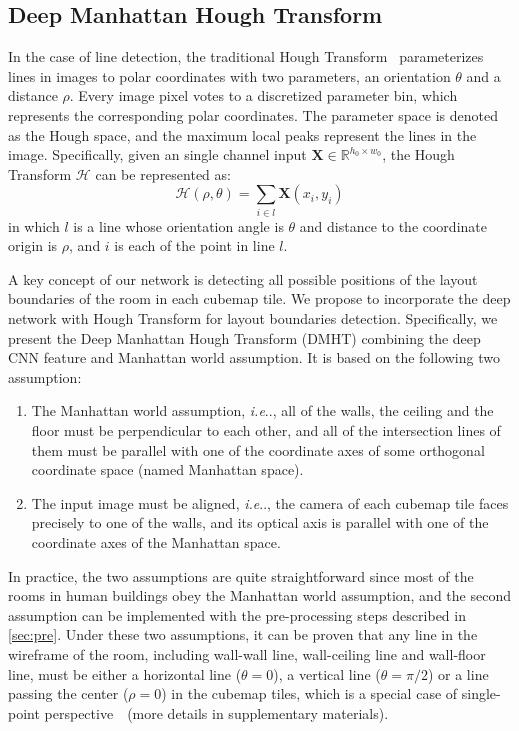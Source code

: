 \documentclass[runningheads]{llncs}
\makeatletter
\DeclareRobustCommand\onedot{\futurelet\@let@token\@onedot}
\def\@onedot{\ifx\@let@token.\else.\null\fi\xspace}
\def\ie{\emph{i.e}\onedot} \def\Ie{\emph{I.e}\onedot}
\makeatother
\begin{document}
\subsection{Deep Manhattan Hough Transform}\label{sec:manhattanhough}
In the case of line detection, the traditional Hough Transform~\cite{hough1962method} parameterizes lines in images to polar coordinates with two parameters, an orientation $\theta$ and a distance $\rho$. Every image pixel votes to a discretized parameter bin, which represents the corresponding polar coordinates. The parameter space is denoted as the Hough space, and the maximum local peaks represent the lines in the image. 
Specifically, given an single channel input $\mathbf{X} \in \mathbb{R}^{h_0\times w_0}$, the Hough Transform $\mathcal{H}$ can be represented as:
\begin{equation}\label{formula:traditionalHT}
    \mathcal{H}(\rho, \theta) = \sum_{i\in l} \mathbf{X}(x_{i}, y_{i})
\end{equation}
in which $l$ is a line whose orientation angle is $\theta$ and distance to the coordinate origin is $\rho$, and $i$ is each of the point in line $l$. 

A key concept of our network is detecting all possible positions of the layout boundaries of the room in each cubemap tile.
We propose to incorporate the deep network with Hough Transform for layout boundaries detection. Specifically, we present the Deep Manhattan Hough Transform (DMHT) combining the deep CNN feature and Manhattan world assumption. It is based on the following two assumption: 
\begin{enumerate}
    \item The Manhattan world assumption, \ie, all of the walls, the ceiling and the floor must be perpendicular to each other, and all of the intersection lines of them must be parallel with one of the coordinate axes of some orthogonal coordinate space (named Manhattan space).
    \item The input image must be aligned, \ie, the camera of each cubemap tile faces precisely to one of the walls, and its optical axis is parallel with one of the coordinate axes of the Manhattan space. 
\end{enumerate}

In practice, the two assumptions are quite straightforward since most of the rooms in human buildings obey the Manhattan world assumption, and the second assumption can be implemented with the pre-processing steps described in \cref{sec:pre}. Under these two assumptions, it can be proven that any line in the wireframe of the room, including wall-wall line, wall-ceiling line and wall-floor line, must be either a horizontal line ($\theta=0$), a vertical line ($\theta=\pi/2$) or a line passing the center ($\rho=0$) in the cubemap tiles, which is a special case of single-point perspective~\cite{horry1997tour}~(more details in supplementary materials).
 
\end{document}
